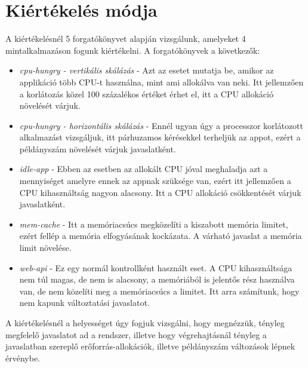 \section{Kiértékelés módja}
A kiértékelésnél 5 forgatókönyvet alapján vizsgálunk, amelyeket 4 mintalkalmazáson fogunk kiértékelni.
A forgatókönyvek a következők:
\begin{itemize}
    \item \emph{cpu-hungry - vertikális skálázás} - Azt az esetet mutatja be, amikor az applikáció több CPU-t használna, mint ami allokálva van neki.
    Itt jellemzően a korlátozás közel 100 százalékos értéket érhet el, itt a CPU allokáció növelését várjuk.
    \item \emph{cpu-hungry - horizontális skálázás} - Ennél ugyan úgy a processzor korlátozott alkalmazást vizsgáljuk,
    itt párhuzamos kérésekkel terheljük az appot, ezért a példányszám növelését várjuk javaslatként.
    \item \emph{idle-app} - Ebben az esetben az allokált CPU jóval meghaladja azt a mennyiséget amelyre ennek az appnak szüksége van,
    ezért itt jellemzően a CPU kihasználtság nagyon alacsony. Itt a CPU allokáció csökkentését várjuk javaslatként.
    \item \emph{mem-cache} - Itt a memóriacsúcs megközelíti a kiszabott memória limitet, ezért fellép a memória 
    elfogyásának kockázata. A várható javaslat a memória limit növelése. 
    \item \emph{web-api} - Ez egy normál kontrollként használt eset. A CPU kihasználtsága nem túl magas, de nem is alacsony,
    a memóriából is jelentős rész használva van, de nem közelíti meg a memóriacsúcs a limitet.
    Itt arra számítunk, hogy nem kapunk változtatási javaslatot.
\end{itemize}

A kiértékelésnél a helyességet úgy fogjuk vizsgálni, hogy megnézzük, tényleg megfelelő javaslatot ad a rendszer,
illetve hogy végrehajtásnál tényleg a javaslatban szereplő erőforrás-allokációk, illetve példányszám változások lépnek érvénybe.




